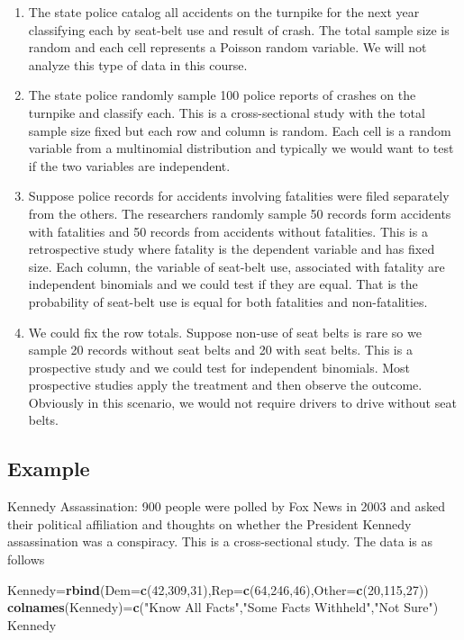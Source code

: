 \documentclass[]{book}
\newenvironment{Shaded}{\begin{snugshade}}{\end{snugshade}}
\newcommand{\KeywordTok}[1]{\textcolor[rgb]{0.13,0.29,0.53}{\textbf{#1}}}
\newcommand{\DataTypeTok}[1]{\textcolor[rgb]{0.13,0.29,0.53}{#1}}
\newcommand{\DecValTok}[1]{\textcolor[rgb]{0.00,0.00,0.81}{#1}}
\newcommand{\StringTok}[1]{\textcolor[rgb]{0.31,0.60,0.02}{#1}}
\newcommand{\NormalTok}[1]{#1}
\theoremstyle{definition}
\theoremstyle{definition}
\theoremstyle{definition}
\theoremstyle{remark}
\begin{document}
\begin{enumerate}
\def\labelenumi{\arabic{enumi}.}
\item
  The state police catalog all accidents on the turnpike for the next
  year classifying each by seat-belt use and result of crash. The total
  sample size is random and each cell represents a Poisson random
  variable. We will not analyze this type of data in this course.
\item
  The state police randomly sample 100 police reports of crashes on the
  turnpike and classify each. This is a cross-sectional study with the
  total sample size fixed but each row and column is random. Each cell
  is a random variable from a multinomial distribution and typically we
  would want to test if the two variables are independent.
\item
  Suppose police records for accidents involving fatalities were filed
  separately from the others. The researchers randomly sample 50 records
  form accidents with fatalities and 50 records from accidents without
  fatalities. This is a retrospective study where fatality is the
  dependent variable and has fixed size. Each column, the variable of
  seat-belt use, associated with fatality are independent binomials and
  we could test if they are equal. That is the probability of seat-belt
  use is equal for both fatalities and non-fatalities.
\item
  We could fix the row totals. Suppose non-use of seat belts is rare so
  we sample 20 records without seat belts and 20 with seat belts. This
  is a prospective study and we could test for independent binomials.
  Most prospective studies apply the treatment and then observe the
  outcome. Obviously in this scenario, we would not require drivers to
  drive without seat belts.
\end{enumerate}

\subsection{Example}\label{example-3}

Kennedy Assassination: 900 people were polled by Fox News in 2003 and
asked their political affiliation and thoughts on whether the President
Kennedy assassination was a conspiracy. This is a cross-sectional study.
The data is as follows

\begin{Shaded}
\begin{Highlighting}[]
\NormalTok{Kennedy=}\KeywordTok{rbind}\NormalTok{(}\DataTypeTok{Dem=}\KeywordTok{c}\NormalTok{(}\DecValTok{42}\NormalTok{,}\DecValTok{309}\NormalTok{,}\DecValTok{31}\NormalTok{),}\DataTypeTok{Rep=}\KeywordTok{c}\NormalTok{(}\DecValTok{64}\NormalTok{,}\DecValTok{246}\NormalTok{,}\DecValTok{46}\NormalTok{),}\DataTypeTok{Other=}\KeywordTok{c}\NormalTok{(}\DecValTok{20}\NormalTok{,}\DecValTok{115}\NormalTok{,}\DecValTok{27}\NormalTok{))}
\KeywordTok{colnames}\NormalTok{(Kennedy)=}\KeywordTok{c}\NormalTok{(}\StringTok{"Know All Facts"}\NormalTok{,}\StringTok{"Some Facts Withheld"}\NormalTok{,}\StringTok{"Not Sure"}\NormalTok{)}
\NormalTok{Kennedy}
\end{Highlighting}
\end{Shaded}
\end{document}
